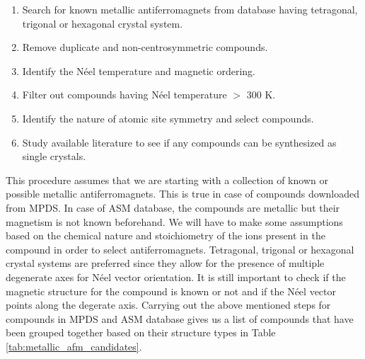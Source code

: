 \documentclass[11pt,edeposit,draftthesis]{uiucthesis2020}
\begin{document}
\begin{mainmatter}
\begin{enumerate}
\item Search for known metallic antiferromagnets from database having tetragonal, trigonal or hexagonal crystal system.
\item Remove duplicate and non-centrosymmetric compounds.
\item Identify the Néel temperature and magnetic ordering.
\item Filter out compounds having Néel temperature $>$ 300 K.
\item Identify the nature of atomic site symmetry and select compounds.
\item Study available literature to see if any compounds can be synthesized as single crystals.
\end{enumerate}

This procedure assumes that we are starting with a collection of known or possible metallic antiferromagnets. This is true in case of compounds downloaded from MPDS. In case of ASM database, the compounds are metallic but their magnetism is not known beforehand. We will have to make some assumptions based on the chemical nature and stoichiometry of the ions present in the compound in order to select antiferromagnets. Tetragonal, trigonal or hexagonal crystal systems are preferred since they allow for the presence of multiple degenerate axes for N\'eel vector orientation. It is still important to check if the magnetic structure for the compound is known or not and if the N\'eel vector points along the degerate axis. Carrying out the above mentioned steps for compounds in MPDS and ASM database gives us a list of compounds that have been grouped together based on their structure types in Table \ref{tab:metallic_afm_candidates}.


\end{mainmatter}
\end{document}
